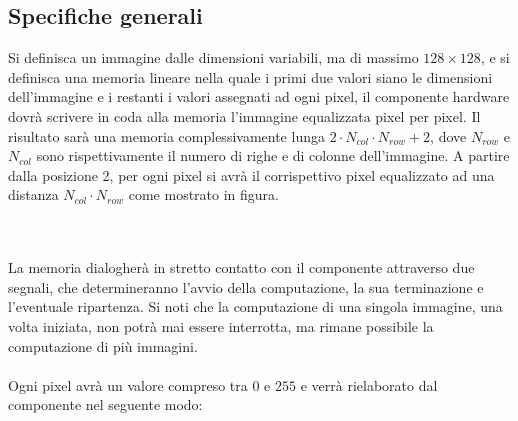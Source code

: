 \documentclass[11pt, a4paper]{article}
\begin{document}
\subsection{Specifiche generali}
Si definisca un immagine dalle dimensioni variabili, ma di massimo $128 \times 128$, e si definisca una memoria lineare nella quale i primi due valori siano le dimensioni dell'immagine e i restanti i valori assegnati ad ogni pixel, il componente hardware dovrà scrivere in coda alla memoria l'immagine equalizzata pixel per pixel.
Il risultato sarà una memoria complessivamente lunga $2 \cdot N_{col} \cdot N_{row} +2$, dove $N_{row}$ e $N_{col}$ sono rispettivamente il numero di righe e di colonne dell'immagine. A partire dalla posizione 2, per ogni pixel si avrà il corrispettivo pixel equalizzato ad una distanza $N_{col} \cdot N_{row}$ come mostrato in figura.
\\
\\

\\
La memoria dialogherà in stretto contatto con il componente attraverso due segnali, che determineranno l'avvio della computazione, la sua terminazione e l'eventuale ripartenza. Si noti che la computazione di una singola immagine, una volta iniziata, non potrà mai essere interrotta, ma rimane possibile la computazione di più immagini.\\
\\
Ogni pixel avrà un valore compreso tra $0$ e $255$ e verrà rielaborato dal componente nel seguente modo:\\
\\
\end{document}
